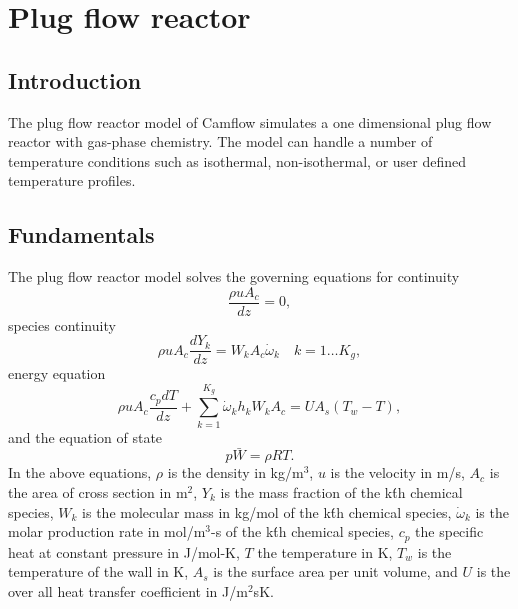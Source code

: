 \newpage
\chapter{Plug flow reactor}

\section{Introduction}
The plug flow reactor model of Camflow simulates a one dimensional plug flow reactor with gas-phase chemistry. The model can handle a number of temperature conditions such as isothermal, non-isothermal, or user defined temperature profiles. 

\section{Fundamentals}
The plug flow reactor model solves the governing equations for continuity
\begin{equation}
 \frac{\rho u A_c}{dz} = 0,
\end{equation}
species continuity
\begin{equation}
 \rho u A_c\frac{dY_k}{dz} = W_kA_c\dot{\omega}_k \quad k=1\ldots K_g,
\end{equation}
energy equation
\begin{equation}
 \rho u A_c\frac{c_pdT}{dz} + \sum_{k=1}^{K_g} \dot{\omega}_kh_kW_kA_c = UA_s(T_w-T),
\end{equation}
and the equation of state
\begin{equation}
 p\bar{W}=\rho R T.
\end{equation}
In the above equations, $\rho$ is the density in kg/m$^3$, $u$ is the velocity in m/s, $A_c$ is the area of cross section in m$^2$, $Y_k$ is the mass fraction of the k\'th chemical species, $W_k$ is the molecular mass in kg/mol of the k\'th chemical species, $\dot{\omega}_k$ is the molar production rate in mol/m$^3$-s of the k\'th chemical species, $c_p$ the specific heat at constant pressure in J/mol-K, $T$ the temperature in K, $T_w$ is the temperature of the wall in K, $A_s$ is the surface area per unit volume, and $U$ is the over all heat transfer coefficient in J/m$^2$sK.


